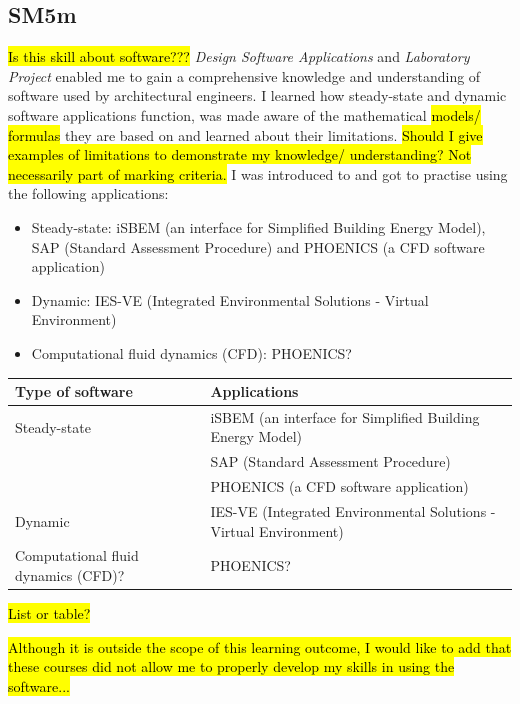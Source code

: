 \subsection*{SM5m}

\hl{Is this skill about software???}
\textit{Design Software Applications} and \textit{Laboratory Project} enabled me to gain a comprehensive knowledge and understanding of software used by architectural engineers.
I learned how steady-state and dynamic software applications function, was made aware of the mathematical \hl{models/ formulas} they are based on and learned about their limitations.
\hl{Should I give examples of limitations to demonstrate my knowledge/ understanding? Not necessarily part of marking criteria.}
I was introduced to and got to practise using the following applications:
\begin{itemize}
    \item Steady-state: iSBEM (an interface for Simplified Building Energy Model), SAP (Standard Assessment Procedure) and PHOENICS (a CFD software application)
    \item Dynamic: IES-VE (Integrated Environmental Solutions - Virtual Environment)
    \item Computational fluid dynamics (CFD): PHOENICS?
\end{itemize}

\begin{table}[htbp]
\begin{tabular}{@{}lp{8cm}@{}}
\toprule
Type of software & Applications \\ \midrule
Steady-state & iSBEM (an interface for Simplified Building Energy Model) \\
 & SAP (Standard Assessment Procedure) \\
 & PHOENICS (a CFD software application) \\
Dynamic & IES-VE (Integrated Environmental Solutions - Virtual Environment) \\
Computational fluid dynamics (CFD)? & PHOENICS? \\ \bottomrule
\end{tabular}
\end{table}

\hl{List or table?}

\hl{Although it is outside the scope of this learning outcome, I would like to add that these courses did not allow me to properly develop my skills in using the software...}


